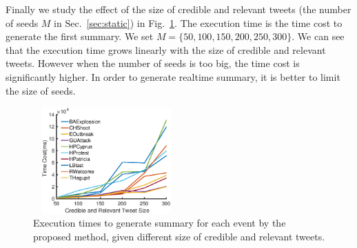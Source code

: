 \documentclass[runningheads]{llncs}
\begin{document}
Finally we study the effect of the size of credible and relevant tweets (the number of seeds $M$ in Sec.~\ref{sec:static}) in Fig.~\ref{fig:summary}. The execution time is the time cost to generate the first summary. We set $M=\{50,100,150,200,250,300\}$. We can see that the execution time grows linearly with the size of credible and relevant tweets. However when the number of seeds is too big, the time cost is significantly higher. In order to generate realtime summary, it is better to limit the size of seeds.


\vspace{-0.5cm}
\begin{figure}
    \centering
    \includegraphics[width=0.5\textwidth,height=1.6in]{summary.eps}
    \setlength{\abovecaptionskip}{-0.1cm}
    \caption{Execution times to generate summary for each event by the proposed method, given different size of credible and relevant tweets.}\label{fig:summary}
\end{figure}
\vspace{-0.5cm}
\end{document}
